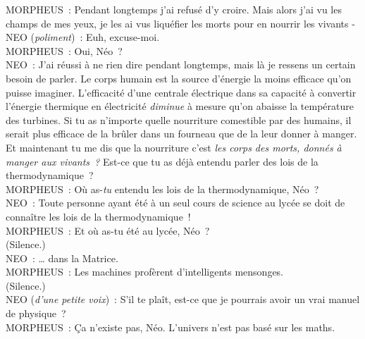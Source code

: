\begin{playdialog}
MORPHEUS~: Pendant longtemps j'ai refusé d'y croire. Mais alors j'ai vu les champs de mes yeux, je les ai vus liquéfier les morts pour en nourrir les vivants -\\

NEO (\emph{poliment})~: Euh, excuse-moi.\\

MORPHEUS~: Oui, Néo~?\\

NEO~: J'ai réussi à ne rien dire pendant longtemps, mais là je ressens un certain besoin de parler. Le corps humain est la source d'énergie la moins efficace qu'on puisse imaginer. L'efficacité d'une centrale électrique dans sa capacité à convertir l'énergie thermique en électricité \emph{diminue} à mesure qu'on abaisse la température des turbines. Si tu as n'importe quelle nourriture comestible par des humains, il serait plus efficace de la brûler dans un fourneau que de la leur donner à manger. Et maintenant tu me dis que la nourriture c'est \emph{les corps des morts, donnés à manger aux vivants~?} Est-ce que tu as déjà entendu parler des lois de la thermodynamique~?\\

MORPHEUS~: Où as-\emph{tu} entendu les lois de la thermodynamique, Néo~?\\

NEO~: Toute personne ayant été à un seul cours de science au lycée se doit de connaître les lois de la thermodynamique~!\\

MORPHEUS~: Et où as-tu été au lycée, Néo~?\\

(Silence.)\\

NEO~: … dans la Matrice.\\

MORPHEUS~: Les machines profèrent d'intelligents mensonges.\\

(Silence.)\\

NEO (\emph{d'une petite voix})~: S'il te plaît, est-ce que je pourrais avoir un vrai manuel de physique~?\\

MORPHEUS~: Ça n'existe pas, Néo. L'univers n'est pas basé sur les maths.\\ \end{playdialog}

